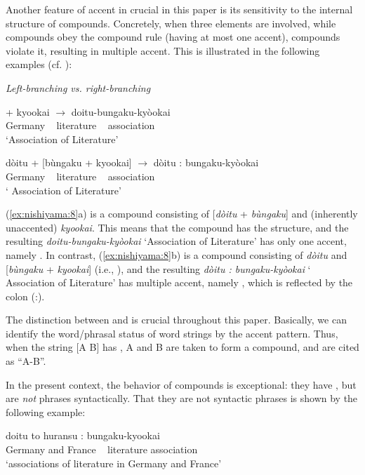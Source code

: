 \documentclass[output=paper]{LSP/langsci}
\begin{document}
Another feature of accent in  crucial in this paper is its sensitivity to the internal structure of compounds. Concretely, when three elements are involved, while  compounds obey the compound  rule (having at most one accent),  compounds violate it, resulting in multiple accent. This is illustrated in the following examples (cf. \citealt[13]{Kubozono2005}):

\ea\label{ex:nishiyama:8}
 \textit{Left-branching vs. right-branching}

  \ea
   + kyookai $\to$ doitu-bungaku-kyòokai \\
    Germany ~ literature ~ association\\
\glt ‘Association of  Literature’

  \ex  
  \gll dòitu + [bùngaku + kyookai] $\to$ dòitu : bungaku-kyòokai \\
    Germany ~ literature ~ association\\
\glt ‘ Association of Literature’
\z
\z

(\ref{ex:nishiyama:8}a) is a compound consisting of [\textit{dòitu} + \textit{bùngaku}] and (inherently unaccented) \textit{kyookai}. This means that the compound has the  structure, and the resulting \textit{doitu-bungaku-kyòokai} ‘Association of  Literature’ has only one accent, namely . In contrast, (\ref{ex:nishiyama:8}b) is a compound consisting of \textit{dòitu} and [\textit{bùngaku} + \textit{kyookai}] (i.e., ), and the resulting \textit{dòitu : bungaku-kyòokai} ‘ Association of Literature’ has multiple accent, namely , which is reflected by the colon (:).

The distinction between  and  is crucial throughout this paper. Basically, we can identify the word/phrasal status of word strings by the accent pattern. Thus, when the string [A B] has , A and B are taken to form a compound, and are cited as “A-B”.

In the present context, the behavior of  compounds is exceptional: they have , but are \textit{not} phrases syntactically. That they are not syntactic phrases is shown by the following example:

\ea\label{ex:nishiyama:9}
 \gll *doitu to huransu    :  bungaku-kyookai\\
Germany and France  ~ {literature association}\\
\glt    ‘associations of literature in Germany and France’
\z
\end{document}
